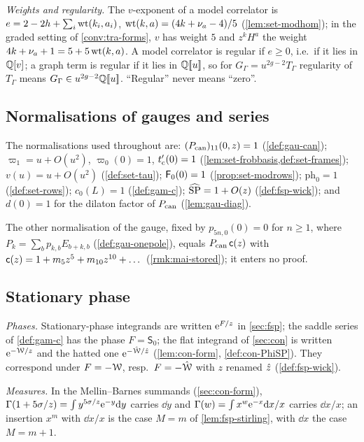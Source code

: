 \emph{Weights and regularity.} The $v$-exponent of a model correlator is $e=2-2h+\sum_i\operatorname{wt}(k_i,a_i)$, $\operatorname{wt}(k,a)=(4k+\nu_a-4)/5$ (\cref{lem:set-modhom}); in the graded setting of \cref{conv:tra-forms}, $v$ has weight $5$ and $z^kH^a$ the weight $4k+\nu_a+1=5+5\operatorname{wt}(k,a)$. A model correlator is regular if $e\geq0$, i.e.\ if it lies in $\mathbb{Q}[v]$; a graph term is regular if it lies in $\mathbb{Q}[\![ u ]\!]$, so for $G_\Gamma=u^{2g-2}T_\Gamma$ regularity of $T_\Gamma$ means $G_\Gamma\in u^{2g-2}\mathbb{Q}[\![ u ]\!]$. ``Regular'' never means ``zero''.

\subsection{Normalisations of gauges and series}
\label{sec:sgn-norm}

The normalisations used throughout are: $(P_{\mathrm{can}})_{11}(0,z)=1$ (\cref{def:gau-can}); $\varpi_1=u+O(u^2)$, $\varpi_0(0)=1$, $t_{\mathrm{c}}'(0)=1$ (\cref{lem:set-frobbasis,def:set-frames}); $v(u)=u+O(u^2)$ (\cref{def:set-tau}); $\mathsf{F}_0(0)=1$ (\cref{prop:set-modrows}); $\mathrm{ph}_0=1$ (\cref{def:set-rows}); $c_0(L)=1$ (\cref{def:gam-c}); $\widehat{\mathrm{SP}}=1+O(z)$ (\cref{def:fsp-wick}); and $d(0)=1$ for the dilaton factor of $P_{\mathrm{can}}$ (\cref{lem:gau-diag}).

The other normalisation of the gauge, fixed by $p_{5n,0}(0)=0$ for $n\geq1$, where $P_k=\sum_bp_{k,b}E_{b+k,b}$ (\cref{def:gau-onepole}), equals $P_{\mathrm{can}}\,\mathsf{c}(z)$ with $\mathsf{c}(z)=1+m_5z^5+m_{10}z^{10}+\dots$ (\cref{rmk:mai-stored}); it enters no proof.

\subsection{Stationary phase}
\label{sec:sgn-sp}

\emph{Phases.} Stationary-phase integrands are written $\mathrm{e}^{F/z}$ in \cref{sec:fsp}; the saddle series of \cref{def:gam-c} has the phase $F=\mathsf S_0$; the flat integrand of \cref{sec:con} is written $\mathrm{e}^{-\mathcal{W}/z}$ and the hatted one $\mathrm{e}^{-\hat{\mathcal{W}}/\hat{z}}$ (\cref{lem:con-form}, \cref{def:con-PhiSP}). They correspond under $F=-\mathcal{W}$, resp.\ $F=-\hat{\mathcal{W}}$ with $z$ renamed $\hat{z}$ (\cref{def:fsp-wick}).

\emph{Measures.} In the Mellin--Barnes summands (\cref{sec:con-form}), $\Gamma(1+5\sigma/z)=\int y^{5\sigma/z}\mathrm{e}^{-y}\mathrm{d} y$ carries $\dd y$ and $\Gamma(w)=\int x^w\mathrm{e}^{-x}\mathrm{d} x/x$ carries $\dd x/x$; an insertion $x^m$ with $\dd x/x$ is the case $M=m$ of \cref{lem:fsp-stirling}, with $\dd x$ the case $M=m+1$.

